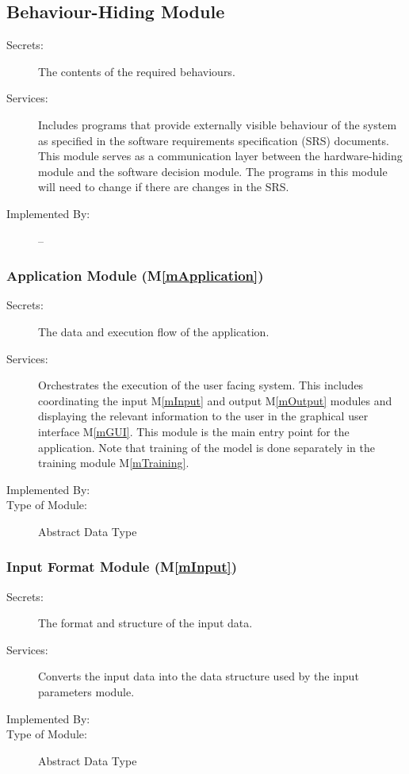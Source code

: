 \documentclass[12pt, titlepage]{article}
\newcommand{\mref}[1]{M\ref{#1}}
\begin{document}
\subsection{Behaviour-Hiding Module}

\begin{description}
\item[Secrets:]The contents of the required behaviours.
\item[Services:]Includes programs that provide externally visible behaviour of
  the system as specified in the software requirements specification (SRS)
  documents. This module serves as a communication layer between the
  hardware-hiding module and the software decision module. The programs in this
  module will need to change if there are changes in the SRS.
\item[Implemented By:] --
\end{description}

\subsubsection{Application Module (\mref{mApplication})}

\begin{description}
\item[Secrets:] The data and execution flow of the application.
\item[Services:] Orchestrates the execution of the user facing system.
This includes coordinating the input \mref{mInput} and output \mref{mOutput}
modules and displaying the relevant information to the user in the graphical
user interface \mref{mGUI}. This module is the main entry point for the
application. Note that training of the model is done separately in the training
module \mref{mTraining}.
\item[Implemented By:] \progname{}
\item[Type of Module:] Abstract Data Type
\end{description}

\subsubsection{Input Format Module (\mref{mInput})}

\begin{description}
\item[Secrets:]The format and structure of the input data.
\item[Services:]Converts the input data into the data structure used by the
  input parameters module.
\item[Implemented By:] \progname{}
\item[Type of Module:] Abstract Data Type
\end{description}
\end{document}
